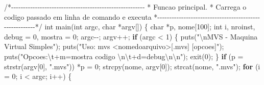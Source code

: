 \documentclass[
  brazilian,
  letterpaper,
]{book}
\newenvironment{Shaded}{\begin{snugshade}}{\end{snugshade}}
\newcommand{\CommentTok}[1]{\textcolor[rgb]{0.37,0.37,0.37}{#1}}
\newcommand{\ControlFlowTok}[1]{\textcolor[rgb]{0.00,0.23,0.31}{\textbf{#1}}}
\newcommand{\DataTypeTok}[1]{\textcolor[rgb]{0.68,0.00,0.00}{#1}}
\newcommand{\DecValTok}[1]{\textcolor[rgb]{0.68,0.00,0.00}{#1}}
\newcommand{\NormalTok}[1]{\textcolor[rgb]{0.00,0.23,0.31}{#1}}
\newcommand{\OperatorTok}[1]{\textcolor[rgb]{0.37,0.37,0.37}{#1}}
\newcommand{\SpecialCharTok}[1]{\textcolor[rgb]{0.37,0.37,0.37}{#1}}
\newcommand{\StringTok}[1]{\textcolor[rgb]{0.13,0.47,0.30}{#1}}
\theoremstyle{plain}
\theoremstyle{definition}
\theoremstyle{remark}
\begin{document}
\begin{Shaded}
\begin{Highlighting}[]
\CommentTok{/*{-}{-}{-}{-}{-}{-}{-}{-}{-}{-}{-}{-}{-}{-}{-}{-}{-}{-}{-}{-}{-}{-}{-}{-}{-}{-}{-}{-}{-}{-}{-}{-}{-}{-}{-}{-}{-}{-}{-}{-}{-}{-}{-}{-}{-}{-}{-}{-}{-}{-}{-}{-}{-}{-}{-}{-}}
\CommentTok{ * Funcao principal.}
\CommentTok{ * Carrega o codigo passado em linha de comando e executa          }
\CommentTok{ *{-}{-}{-}{-}{-}{-}{-}{-}{-}{-}{-}{-}{-}{-}{-}{-}{-}{-}{-}{-}{-}{-}{-}{-}{-}{-}{-}{-}{-}{-}{-}{-}{-}{-}{-}{-}{-}{-}{-}{-}{-}{-}{-}{-}{-}{-}{-}{-}{-}{-}{-}{-}{-}{-}{-}{-}*/}
\DataTypeTok{int}\NormalTok{ main}\OperatorTok{(}\DataTypeTok{int}\NormalTok{ argc}\OperatorTok{,} \DataTypeTok{char} \OperatorTok{*}\NormalTok{argv}\OperatorTok{[])}
\OperatorTok{\{}
    \DataTypeTok{char} \OperatorTok{*}\NormalTok{p}\OperatorTok{,}\NormalTok{ nome}\OperatorTok{[}\DecValTok{100}\OperatorTok{];}
    \DataTypeTok{int}\NormalTok{ i}\OperatorTok{,}\NormalTok{ nroinst}\OperatorTok{,}\NormalTok{ debug }\OperatorTok{=} \DecValTok{0}\OperatorTok{,}\NormalTok{ mostra }\OperatorTok{=} \DecValTok{0}\OperatorTok{;}
\NormalTok{    argc}\OperatorTok{{-}{-};}
\NormalTok{    argv}\OperatorTok{++;}
    \ControlFlowTok{if} \OperatorTok{(}\NormalTok{argc }\OperatorTok{\textless{}} \DecValTok{1}\OperatorTok{)}
    \OperatorTok{\{}
\NormalTok{        puts}\OperatorTok{(}\StringTok{"}\SpecialCharTok{\textbackslash{}n}\StringTok{MVS {-} Maquina Virtual Simples"}\OperatorTok{);}
\NormalTok{        puts}\OperatorTok{(}\StringTok{"Uso: mvs \textless{}nomedoarquivo\textgreater{}[.mvs] [opcoes]"}\OperatorTok{);}
\NormalTok{        puts}\OperatorTok{(}\StringTok{"Opcoes:}\SpecialCharTok{\textbackslash{}t}\StringTok{+m=mostra codigo }\SpecialCharTok{\textbackslash{}n\textbackslash{}t}\StringTok{+d=debug}\SpecialCharTok{\textbackslash{}n\textbackslash{}n}\StringTok{"}\OperatorTok{);}
\NormalTok{        exit}\OperatorTok{(}\DecValTok{0}\OperatorTok{);}
    \OperatorTok{\}}
    \ControlFlowTok{if} \OperatorTok{(}\NormalTok{p }\OperatorTok{=}\NormalTok{ strstr}\OperatorTok{(}\NormalTok{argv}\OperatorTok{[}\DecValTok{0}\OperatorTok{],} \StringTok{".mvs"}\OperatorTok{))}
        \OperatorTok{*}\NormalTok{p }\OperatorTok{=} \DecValTok{0}\OperatorTok{;}
\NormalTok{    strcpy}\OperatorTok{(}\NormalTok{nome}\OperatorTok{,}\NormalTok{ argv}\OperatorTok{[}\DecValTok{0}\OperatorTok{]);}
\NormalTok{    strcat}\OperatorTok{(}\NormalTok{nome}\OperatorTok{,} \StringTok{".mvs"}\OperatorTok{);}
    \ControlFlowTok{for} \OperatorTok{(}\NormalTok{i }\OperatorTok{=} \DecValTok{0}\OperatorTok{;}\NormalTok{ i }\OperatorTok{\textless{}}\NormalTok{ argc}\OperatorTok{;}\NormalTok{ i}\OperatorTok{++)}
    \OperatorTok{\{}

\end{Highlighting}
\end{Shaded}
\end{document}
